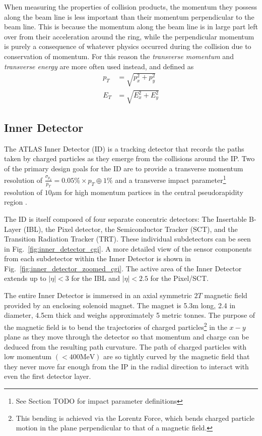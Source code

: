 When measuring the properties of collision products, the momentum they possess along the beam line is less important than their momentum perpendicular to the beam line. This is because the momentum along the beam line is in large part left over from their acceleration around the ring, while the perpendicular momentum is purely a consequence of whatever physics occurred during the collision due to conservation of momentum.
For this reason the \textit{transverse momentum} and \textit{transverse energy} are more often used instead, and defined as
\begin{align}
p_T &= \sqrt{p_x^2 + p_y^2} \\
E_T &= \sqrt{E_x^2 + E_y^2}
\label{eqn:transverse_momentum_energy}
\end{align}

\subsection{Inner Detector}
\label{sec:inner_detector}
The ATLAS Inner Detector (ID) \cite{CERN-LHCC-97-016} \cite{ATLAS-TDR-2008} is a tracking detector that records the paths taken by charged particles as they emerge from the collisions around the IP.
Two of the primary design goals for the ID are to provide a transverse momentum resolution of $\frac{\sigma_{p_T}}{p_T} = 0.05\% \times p_T \oplus 1\%$ and a transverse impact parameter\footnote{See Section TODO for impact parameter definitions} resolution of $10 \mu$m for high momentum partices in the central pseudorapidity region \cite{ATLAS-TDR-2008}.

The ID is itself composed of four separate concentric detectors: The Insertable B-Layer (IBL), the Pixel detector, the Semiconductor Tracker (SCT), and the Transition Radiation Tracker (TRT).
These individual subdetectors can be seen in Fig.~\ref{fig:inner_detector_cgi}.
A more detailed view of the sensor components from each subdetector within the Inner Detector is shown in Fig.~\ref{fig:inner_detector_zoomed_cgi}.
The active area of the Inner Detector extends up to $|\eta| < 3$ for the IBL and $|\eta| < 2.5$ for the Pixel/SCT.

The entire Inner Detector is immersed in an axial symmetric $2T$ magnetic field provided by an enclosing solenoid magnet.
The magnet is 5.3m long, 2.4 in diameter, 4.5cm thick and weighs approximately 5 metric tonnes.
The purpose of the magnetic field is to bend the trajectories of charged particles\footnote{This bending is achieved via the Lorentz Force, which bends charged particle motion in the plane perpendicular to that of a magnetic field.} in the $x-y$ plane as they move through the detector so that momentum and charge can be deduced from the resulting path curvature.
The path of charged particles with low momentum $(< 400 \mathrm{MeV})$ are so tightly curved by the magnetic field that they never move far enough from the IP in the radial direction to interact with even the first detector layer.

